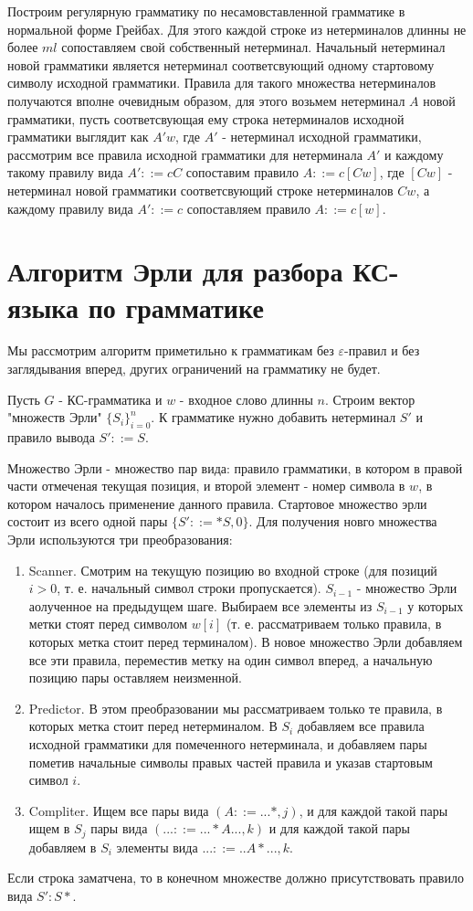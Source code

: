 Построим регулярную грамматику по несамовставленной грамматике в нормальной форме Грейбах. Для этого каждой строке из нетерминалов длинны не более $ml$ сопоставляем
свой собственный нетерминал. Начальный нетерминал новой грамматики является нетерминал соответсвующий одному стартовому символу исходной грамматики. Правила для
такого множества нетерминалов получаются вполне очевидным образом, для этого возьмем нетерминал $A$ новой грамматики, пусть соответсвующая ему строка нетерминалов
исходной грамматики выглядит как $A'w$, где $A'$ - нетерминал исходной грамматики, рассмотрим все правила исходной грамматики для нетерминала $A'$ и каждому такому
 правилу вида $A' ::= cC$ сопоставим правило $A ::= c[Cw]$, где $[Cw]$ - нетерминал новой грамматики соответсвующий строке нетерминалов $Cw$, а каждому правилу
 вида $A' ::= c$ сопоставляем правило $A ::= c[w]$.
 
\section{Алгоритм Эрли для разбора КС-языка по грамматике}

Мы рассмотрим алгоритм приметильно к грамматикам без $\varepsilon$-правил и без заглядывания вперед, других ограничений на грамматику не будет.

Пусть $G$ - КС-грамматика и $w$ - входное слово длинны $n$. Строим вектор "множеств Эрли" $\lbrace S_i\rbrace^{n}_{i=0}$. К грамматике нужно добавить нетерминал $S'$
и правило вывода $S' ::= S$.

Множество Эрли - множество пар вида: правило грамматики, в котором в правой части отмеченая текущая позиция, и второй элемент - номер символа в $w$, в котором началось
применение данного правила. Стартовое множество эрли состоит из всего одной пары $\lbrace S' ::= *S, 0\rbrace$.
Для получения новго множества Эрли используются три преобразования:

\begin{enumerate}
\item Scanner. Смотрим на текущую позицию во входной строке (для позиций $i > 0$, т. е. начальный символ строки пропускается). $S_{i-1}$ - множество Эрли
аолученное на предыдущем шаге. Выбираем все элементы из $S_{i-1}$ у которых метки стоят перед символом $w[i]$ (т. е. рассматриваем только правила, в которых метка стоит
перед терминалом). В новое множество Эрли добавляем все эти правила, переместив метку на один символ вперед, а начальную позицию пары оставляем неизменной.

\item Predictor. В этом преобразовании мы рассматриваем только те правила, в которых метка стоит перед нетерминалом. В $S_i$ добавляем все правила исходной грамматики
для помеченного нетерминала, и добавляем пары пометив начальные символы правых частей правила и указав стартовым символ $i$.

\item Compliter. Ищем все пары вида $(A ::= ...*, j)$, и для каждой такой пары ищем в $S_j$ пары вида $(... ::= ...*A..., k)$ и для каждой такой пары добавляем
в $S_i$ элементы вида $... ::= ..A*..., k$.
\end{enumerate}

Если строка заматчена, то в конечном множестве должно присутствовать правило вида $S' : S*$.
